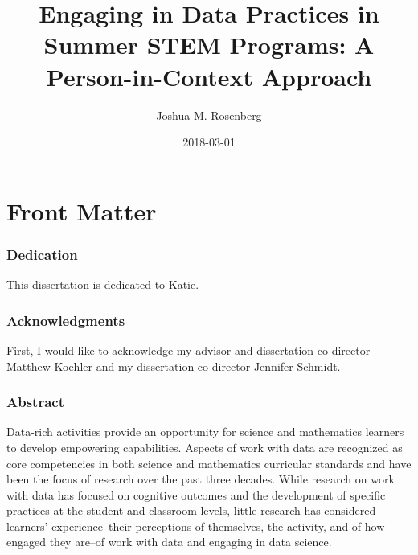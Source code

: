 \documentclass[]{book}
\title{Engaging in Data Practices in Summer STEM Programs: A Person-in-Context
Approach}
\author{Joshua M. Rosenberg}
\date{2018-03-01}
\theoremstyle{definition}
\theoremstyle{definition}
\theoremstyle{definition}
\theoremstyle{remark}
\begin{document}
\maketitle

{
\setcounter{tocdepth}{1}
\tableofcontents
}
\chapter{Front Matter}\label{front-matter}

\subsection{Dedication}\label{dedication}

This dissertation is dedicated to Katie.

\subsection{Acknowledgments}\label{acknowledgments}

First, I would like to acknowledge my advisor and dissertation
co-director Matthew Koehler and my dissertation co-director Jennifer
Schmidt.

\subsection{Abstract}\label{abstract}

Data-rich activities provide an opportunity for science and mathematics
learners to develop empowering capabilities. Aspects of work with data
are recognized as core competencies in both science and mathematics
curricular standards and have been the focus of research over the past
three decades. While research on work with data has focused on cognitive
outcomes and the development of specific practices at the student and
classroom levels, little research has considered learners'
experience--their perceptions of themselves, the activity, and of how
engaged they are--of work with data and engaging in data science.
\end{document}
